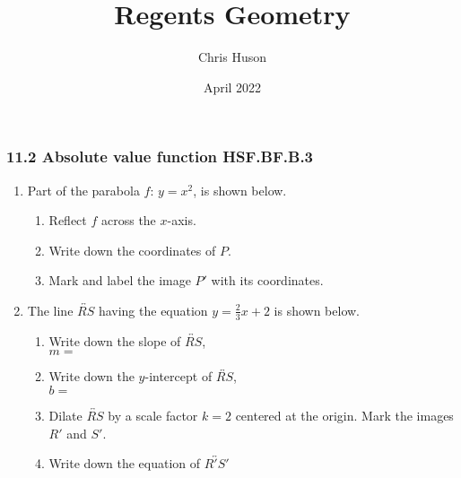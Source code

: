 \documentclass[12pt, twoside]{article}
\title{Regents Geometry}
\author{Chris Huson}
\date{April 2022}
\begin{document}
\subsubsection*{11.2 Absolute value function \hfill HSF.BF.B.3}
\begin{enumerate}
\item Part of the parabola $f$: $y=x^2$, is shown below. 
\begin{multicols}{2}
  \begin{enumerate}
    \item Reflect $f$ across the $x$-axis.
    \item Write down the coordinates of $P$.
    \item Mark and label the image $P'$ with its coordinates. \vspace{2cm}
  \end{enumerate}
  \begin{flushright}
\end{flushright}
\end{multicols}

\item The line $\overleftrightarrow{RS}$ having the equation $\displaystyle y=\frac{2}{3}x+2$ is shown below.
\begin{multicols}{2}
  \begin{enumerate}
    \item Write down the slope of $\overleftrightarrow{RS}$,\\[0.25cm] $m=$
    \item Write down the $y$-intercept of $\overleftrightarrow{RS}$,\\[0.25cm] $b=$
    \item Dilate $\overleftrightarrow{RS}$ by a scale factor $k=2$ centered at the origin. Mark the images $R'$ and $S'$.
    \item Write down the equation of $\overleftrightarrow{R'S'}$
  \end{enumerate}
  \begin{flushright}
  \end{flushright}
\end{multicols}%


\end{enumerate}
\end{document}
